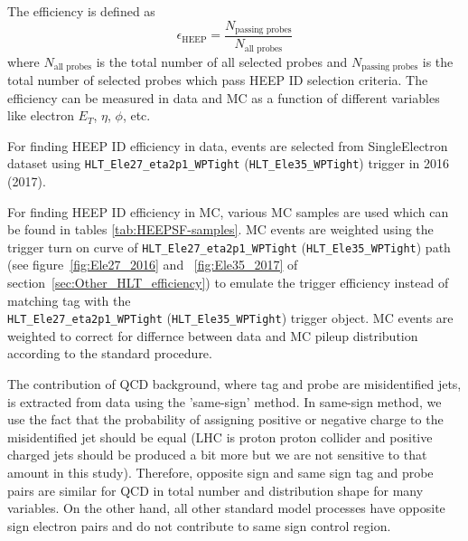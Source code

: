 The efficiency is defined as
\begin{equation}
\label{SF:eq:eff}
\epsilon_{\text{HEEP}} = \frac{N_{\text{passing probes}}}{N_{\text{all probes}}}
\end{equation}
where $N_{\text{all probes}}$ is the total number of all selected probes and $N_{\text{passing probes}}$ is the total number of selected probes which pass HEEP ID selection criteria. The efficiency can be measured in data and MC as a function of different variables like electron $E_{T}$, $\eta$, $\phi$, etc.

For finding HEEP ID efficiency in data, events are selected from SingleElectron dataset using \texttt{HLT\_Ele27\_eta2p1\_WPTight} (\texttt{HLT\_Ele35\_WPTight}) trigger in 2016 (2017).

For finding HEEP ID efficiency in MC, various MC samples are used which can be found in tables \ref{tab:HEEPSF-samples}. MC events are weighted using the trigger turn on curve of \texttt{HLT\_Ele27\_eta2p1\_WPTight} (\texttt{HLT\_Ele35\_WPTight}) path (see figure~\ref{fig:Ele27_2016} and ~\ref{fig:Ele35_2017} of section~\ref{sec:Other_HLT_efficiency}) to emulate the trigger efficiency instead of matching tag with the \\
\texttt{HLT\_Ele27\_eta2p1\_WPTight} (\texttt{HLT\_Ele35\_WPTight}) trigger object.
MC events are weighted to correct for differnce between data and MC pileup distribution according to the standard procedure.

The contribution of  QCD background, where tag and  probe are misidentified jets, is extracted from data using the 'same-sign' method.
In same-sign method, we use the fact that the probability of assigning positive or negative charge to the misidentified jet should be equal (LHC is proton proton collider and positive charged jets should be produced a bit more but we are not sensitive to that amount in this study).
Therefore, opposite sign and same sign tag and probe pairs are similar for QCD in total number and distribution shape for many variables. On the other hand, all other standard model processes have opposite sign electron pairs and do not contribute to same sign control region.

